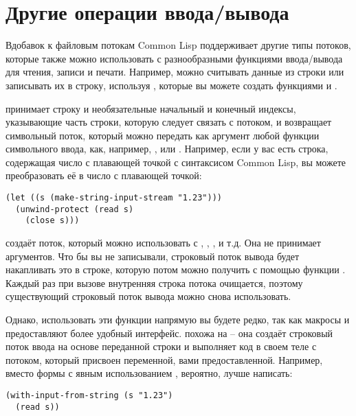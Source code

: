 \section{Другие операции ввода/вывода}

Вдобавок к файловым потокам Common Lisp поддерживает другие типы потоков, которые также
можно использовать с разнообразными функциями ввода/вывода для чтения, записи и
печати. Например, можно считывать данные из строки или записывать их в строку, используя
, которые вы можете создать функциями 
и .

 принимает строку и необязательные начальный и конечный
индексы, указывающие часть строки, которую следует связать с потоком, и возвращает
символьный поток, который можно передать как аргумент любой функции символьного ввода,
как, например, ,  или . Например, если у вас
есть строка, содержащая число с плавающей точкой с синтаксисом Common Lisp, вы можете
преобразовать её в число с плавающей точкой:

\begin{lstlisting}
(let ((s (make-string-input-stream "1.23"))) 
  (unwind-protect (read s) 
    (close s))) 
\end{lstlisting}

 создаёт поток, который можно использовать с
, , ,  и т.д. Она не принимает
аргументов. Что бы вы не записывали, строковый поток вывода будет накапливать это в
строке, которую потом можно получить с помощью функции
. Каждый раз при вызове 
внутренняя строка потока очищается, поэтому существующий строковый поток вывода можно
снова использовать.

Однако, использовать эти функции напрямую вы будете редко, так как макросы
 и  предоставляют более удобный
интерфейс.  похожа на  -- она создаёт
строковый поток ввода на основе переданной строки и выполняет код в своем теле с потоком,
который присвоен переменной, вами предоставленной. Например, вместо формы  с
явным использованием , вероятно, лучше написать:

\begin{lstlisting}
(with-input-from-string (s "1.23") 
  (read s))
\end{lstlisting}

